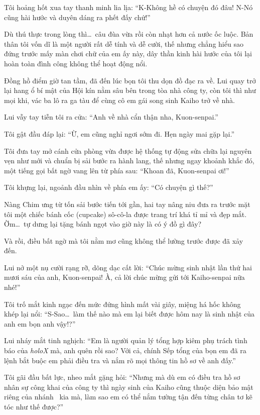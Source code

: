 \documentclass[../main.tex]{subfiles}
\begin{document}
Tôi hoảng hốt xua tay thanh minh lia lịa: ``K-Không hề có chuyện đó đâu! N-Nó cũng hài hước và duyên dáng ra phết đấy chứ!''

Dù thú thực trong lòng thì\dots\ câu đùa vừa rồi còn nhạt hơn cả nước ốc luộc. Bản thân tôi vốn dĩ là một người rất dễ tính và dễ cười, thế nhưng chẳng hiểu sao đứng trước mấy màn chơi chữ của em ấy này, dây thần kinh hài hước của tôi lại hoàn toàn đình công không thể hoạt động nổi.

\ct

Đồng hồ điểm giờ tan tầm, đã đến lúc bọn tôi thu dọn đồ đạc ra về. Lui quay trở lại hang ổ bí mật của Hội kín nằm sâu bên trong tòa nhà công ty, còn tôi thì như mọi khi, vác ba lô ra ga tàu để cùng cô em gái song sinh Kaiho trở về nhà.

Lui vẫy tay tiễn tôi ra cửa: ``Anh về nhà cẩn thận nha, Kuon-senpai.''

Tôi gật đầu đáp lại: ``Ừ, em cũng nghỉ ngơi sớm đi. Hẹn ngày mai gặp lại.''

Tôi đưa tay mở cánh cửa phòng vừa được hệ thống tự động sửa chữa lại nguyên vẹn như mới và chuẩn bị sải bước ra hành lang, thế nhưng ngay khoảnh khắc đó, một tiếng gọi bất ngờ vang lên từ phía sau: ``Khoan đã, Kuon-senpai ơi!''

Tôi khựng lại, ngoảnh đầu nhìn về phía em ấy: ``Có chuyện gì thế?''

Nàng Chim ưng từ tốn sải bước tiến tới gần, hai tay nâng niu đưa ra trước mặt tôi một chiếc bánh cốc (cupcake) sô-cô-la được trang trí khá tỉ mỉ và đẹp mắt. Ờm\dots\ tự dưng lại tặng bánh ngọt vào giờ này là có ý đồ gì đây?

Và rồi, điều bất ngờ mà tôi nằm mơ cũng không thể lường trước được đã xảy đến.

Lui nở một nụ cười rạng rỡ, dõng dạc cất lời: ``Chúc mừng sinh nhật lần thứ hai mươi sáu của anh, Kuon-senpai! À, cả lời chúc mừng gửi tới Kaiho-senpai nữa nhé!''

Tôi trố mắt kinh ngạc đến mức đứng hình mất vài giây, miệng há hốc không khép lại nổi: ``S-Sao\dots\ làm thế nào mà em lại biết được hôm nay là sinh nhật của anh em bọn anh vậy!?''

Lui nháy mắt tinh nghịch: ``Em là người quản lý tổng hợp kiêm phụ trách tình báo của \textit{holoX} mà, anh quên rồi sao? Với cả, chính Sếp tổng của bọn em đã ra lệnh bắt buộc em phải điều tra và nắm rõ mọi thông tin hồ sơ về anh đấy.''

Tôi gãi đầu bất lực, nheo mắt gặng hỏi: ``Nhưng mà dù em có điều tra hồ sơ nhân sự công khai của công ty thì ngày sinh của Kaiho cũng thuộc diện bảo mật riêng của nhánh \hls\ kia mà, làm sao em có thể nắm tường tận đến từng chân tơ kẽ tóc như thế được?''
\end{document}
